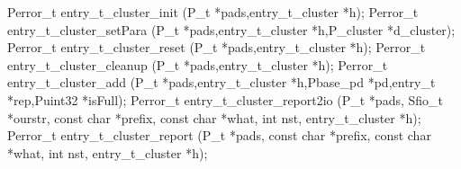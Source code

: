 \begin{code}
Perror\_t entry\_t\_cluster\_init (P\_t *pads,entry\_t\_cluster *h);
Perror\_t entry\_t\_cluster\_setPara (P\_t *pads,entry\_t\_cluster *h,P_cluster *d_cluster);
Perror\_t entry\_t\_cluster\_reset (P\_t *pads,entry\_t\_cluster *h);
Perror\_t entry\_t\_cluster\_cleanup (P\_t *pads,entry\_t\_cluster *h);
Perror\_t entry\_t\_cluster\_add (P\_t *pads,entry\_t\_cluster *h,Pbase\_pd
*pd,entry\_t *rep,Puint32 *isFull);
Perror\_t entry\_t\_cluster\_report2io (P\_t *pads, Sfio\_t *ourstr,
const char *prefix, const char *what, int nst, entry\_t\_cluster *h); 
Perror\_t entry\_t\_cluster\_report (P\_t *pads, const char *prefix,
const char *what, int nst, entry\_t\_cluster *h);
\end{code}
